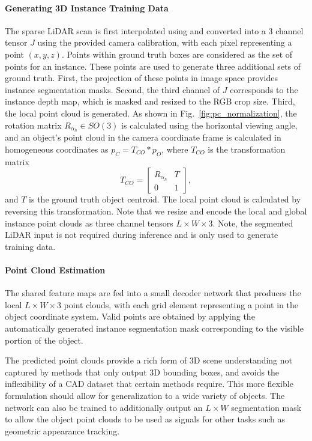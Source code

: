 \documentclass[10pt,twocolumn,letterpaper]{article}
\begin{document}
	\paragraph{Generating 3D Instance Training Data}
	The sparse LiDAR scan is first interpolated using \cite{ku2018defense} and converted into a 3 channel tensor $J$ using the provided camera calibration, with each pixel representing a point $(x, y, z)$. Points within ground truth boxes are considered as the set of points for an instance. These points are used to generate three additional sets of ground truth. First, the projection of these points in image space provides instance segmentation masks. Second, the third channel of $J$ corresponds to the instance depth map, which is masked and resized to the RGB crop size. Third, the local point cloud is generated. As shown in Fig.~\ref{fig:pc_normalization}, the rotation matrix $R_{\alpha_{h}}\in SO(3)$ is calculated using the horizontal viewing angle, and an object's point cloud in the camera coordinate frame is calculated in homogeneous coordinates as $p_{C}=T_{CO}*p_{O}$, where $T_{CO}$ is the transformation matrix
	\begin{equation}\label{eq:transform}
	T_{CO}=\begin{bmatrix}
	R_{\alpha_{h}} & T \\
	0 & 1 
	\end{bmatrix},
	\end{equation}
and $T$ is the ground truth object centroid. The local point cloud is calculated by reversing this transformation. Note that we resize and encode the local and global instance point clouds as three channel tensors $L \times W \times 3$. Note, the segmented LiDAR input is not required during inference and is only used to generate training data.
	
	\paragraph{Point Cloud Estimation}
	The shared feature maps are fed into a small decoder network that produces the local $L \times W \times 3$ point clouds, with each grid element representing a point in the object coordinate system. Valid points are obtained by applying the automatically generated instance segmentation mask corresponding to the visible portion of the object.
	
	The predicted point clouds provide a rich form of 3D scene understanding not captured by methods that only output 3D bounding boxes, and avoids the inflexibility of a CAD dataset that certain methods \cite{chabot_deepmanta, kundu_3drcnn} require. This more flexible formulation should allow for generalization to a wide variety of objects. The network can also be trained to additionally output an $L \times W$ segmentation mask to allow the object point clouds to be used as signals for other tasks such as geometric appearance tracking.
	
\end{document}
